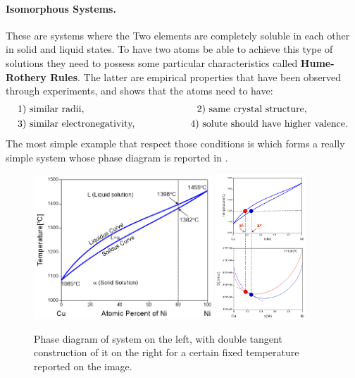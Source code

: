 \paragraph{Isomorphous Systems.} These are systems where the Two elements are completely soluble in each other in solid and liquid states. To have two atoms be able to achieve this type of solutions they need to possess some particular characteristics called \textbf{Hume-Rothery Rules}. The latter are empirical properties that have been observed through experiments, and shows that the atoms need to have: 
\begin{align*}
    & 1)\text{ similar radii,} \hspace{4.05cm} 2)\text{ same crystal structure,}\\
    & 3)\text{ similar electronegativity,} \hspace{2cm} 4)\text{ solute should have higher valence.}
\end{align*}
The most simple example that respect those conditions is  which forms a really simple system whose phase diagram is reported in .
\begin{figure}[t]
    \centering
    \includegraphics[width=0.6\textwidth]{Immagini/Cu-Ni.png}
    \includegraphics[width=0.3\textwidth]{Immagini/Cu-NiDoubTg.png}
    \caption
    {
        Phase diagram of  system on the left, with double tangent construction of it on the right for a certain fixed temperature reported on the image. 
    }
    \label{fig:Cu-Ni}
\end{figure}
